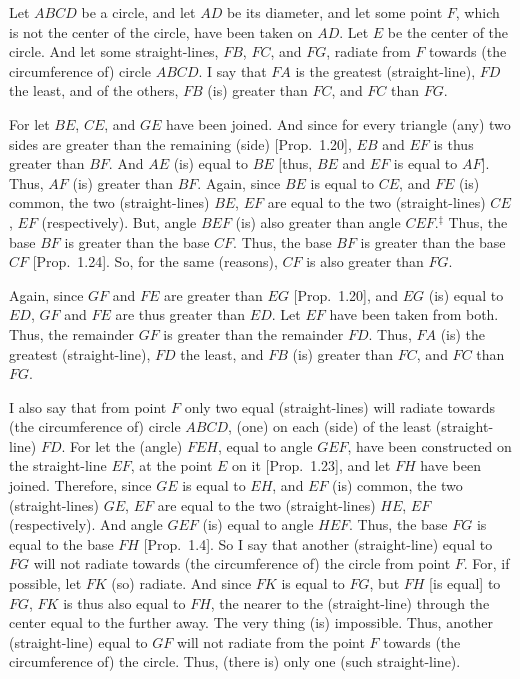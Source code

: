 Let $ABCD$ be a circle, and let $AD$ be its diameter, and
let some point $F$, which is not the center of the circle, have been taken on $AD$.
Let $E$ be the center of the circle. And let some straight-lines, $FB$, $FC$,
and $FG$, radiate from $F$ towards (the circumference of) circle $ABCD$.
I say that $FA$ is the greatest (straight-line), $FD$ the least, and of the others, $FB$ (is)
greater than $FC$, and $FC$ than $FG$.

For let $BE$, $CE$, and $GE$ have been joined. And since for every triangle
(any) two sides are greater than the remaining (side) [Prop.~1.20],
$EB$ and $EF$ is thus greater than $BF$. And $AE$ (is) equal to $BE$ [thus,
$BE$ and $EF$ is equal to $AF$]. Thus, $AF$ (is) greater than $BF$. Again,
since $BE$ is equal to $CE$, and $FE$ (is) common, the two (straight-lines)
$BE$, $EF$ are equal to the two (straight-lines) $CE$, $EF$ (respectively). But, angle $BEF$ (is)
also greater than angle $CEF$.$^\ddag$ Thus, the base $BF$ is greater than the base $CF$.
Thus, the base $BF$ is greater than the base $CF$ [Prop.~1.24]. So, for the same (reasons), $CF$ is also greater than $FG$.

Again, since $GF$ and $FE$ are greater than $EG$ [Prop.~1.20], and $EG$
(is) equal to $ED$, $GF$ and $FE$ are thus greater than $ED$. Let $EF$ have been
taken from both. Thus, the remainder $GF$ is greater than the remainder $FD$.
Thus, $FA$ (is) the greatest  (straight-line), $FD$ the least, and $FB$ (is) greater than $FC$, and $FC$ than $FG$.

I also say that from point $F$ only two equal (straight-lines) will radiate
towards (the circumference of) circle $ABCD$, (one) on each (side) of the
least (straight-line) $FD$. For let the (angle) $FEH$, equal to angle $GEF$, have been constructed on the straight-line $EF$, at the point $E$ on it [Prop.~1.23], and
let $FH$ have been joined. Therefore, since $GE$ is equal to $EH$, and $EF$ (is) common, the two (straight-lines) $GE$, $EF$ are equal to the two (straight-lines)
$HE$, $EF$ (respectively). And angle $GEF$ (is) equal to angle $HEF$. Thus, the base $FG$ is
equal to the base $FH$ [Prop.~1.4]. So I say that another (straight-line)
equal to $FG$
will not radiate towards (the circumference of)
the circle from point $F$. For, if possible, let $FK$ (so) radiate. And since
$FK$ is equal to $FG$, but $FH$ [is equal] to $FG$, $FK$ is thus also equal to
$FH$, the nearer to the (straight-line) through the center equal to the
further away. The very thing (is) impossible. Thus, another (straight-line)
equal to $GF$ will not radiate from the point $F$ towards (the circumference of) the circle.
Thus, (there is) only one (such straight-line).

